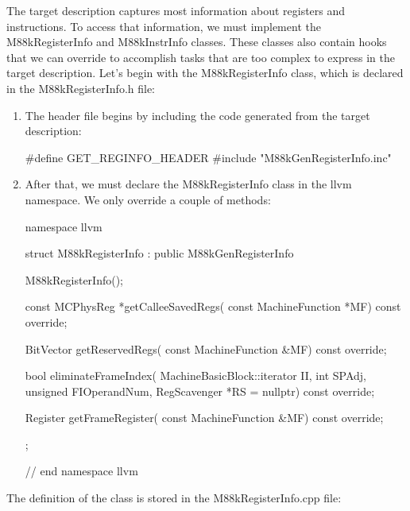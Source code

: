 
The target description captures most information about registers and instructions. To access that information, we must implement the M88kRegisterInfo and M88kInstrInfo classes. These classes also contain hooks that we can override to accomplish tasks that are too complex to express in the target description. Let’s begin with the M88kRegisterInfo class, which is declared in the M88kRegisterInfo.h file:

\begin{enumerate}
\item
The header file begins by including the code generated from the target description:

\begin{cpp}
#define GET_REGINFO_HEADER
#include "M88kGenRegisterInfo.inc"
\end{cpp}

\item
After that, we must declare the M88kRegisterInfo class in the llvm namespace. We only override a couple of methods:

\begin{cpp}
namespace llvm {
struct M88kRegisterInfo : public M88kGenRegisterInfo {
    M88kRegisterInfo();

    const MCPhysReg *getCalleeSavedRegs(
        const MachineFunction *MF) const override;

    BitVector getReservedRegs(
        const MachineFunction &MF) const override;

    bool eliminateFrameIndex(
        MachineBasicBlock::iterator II, int SPAdj,
        unsigned FIOperandNum,
        RegScavenger *RS = nullptr) const override;

    Register getFrameRegister(
        const MachineFunction &MF) const override;
};
} // end namespace llvm
\end{cpp}

\end{enumerate}

The definition of the class is stored in the M88kRegisterInfo.cpp file:

